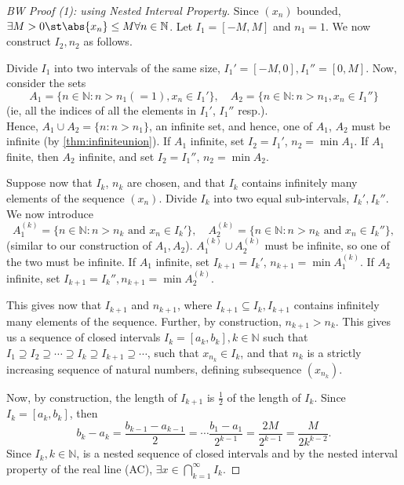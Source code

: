 \documentclass[12pt]{article}
\begin{document}
\begin{proof}[BW Proof (1): using Nested Interval Property]
  \footnotemark Since $(x_n)$ bounded, $\exists M > 0 \st \abs{x_n} \leq M \forall n \in \mathbb{N}$. Let $I_1 = [-M, M]$ and $n_1 = 1$. We now construct $I_2, n_2$ as follows.

  Divide $I_1$ into two intervals of the same size, $I_1' = [-M, 0], I_1'' = [0, M]$. Now, consider the sets $$A_1 = \{n \in \mathbb{N} : n > n_1 (= 1), x_n \in I_1'\},\quad A_2 = \{n \in \mathbb{N} : n > n_1, x_{n} \in I_1''\}$$ (ie, all the indices of all the elements in $I_1'$, $I_1''$ resp.). \\Hence, $A_1 \cup A_2 = \{n : n > n_1\}$, an infinite set, and hence, one of $A_1$, $A_2$ must be infinite (by \cref{thm:infiniteunion}).
  If $A_1$ infinite, set $I_2 = I_1'$, $n_2 = \min A_1$. If $A_1$ finite, then $A_2$ infinite, and set $I_2 = I_1''$, $n_2 = \min A_2$.

  Suppose now that $I_k$, $n_k$ are chosen, and that $I_k$ contains infinitely many elements of the sequence $(x_n)$. Divide $I_k$ into two equal sub-intervals, $I_k', I_k''$. We now introduce $$A_1^{(k)} = \{n \in \mathbb{N} : n > n_k\text{ and } x_{n}\in I_k'\}, \quad A_2^{(k)} = \{n \in \mathbb{N} : n > n_k \text{ and } x_{n} \in I_k'' \},$$  (similar to our construction of $A_1, A_2$). $A_1^{(k)} \cup A_2^{(k)}$ must be infinite, so one of the two must be infinite. If $A_1$ infinite, set $I_{k+1} = I_k'$, $n_{k+1} = \min A_{1}^{(k)}$. If $A_2$ infinite, set $I_{k+1} = I_{k}'', n_{k+1} = \min A_{2}^{(k)}$.

  This gives now that $I_{k+1}$ and $n_{k+1}$, where $I_{k+1} \subseteq I_k, I_{k+1}$ contains infinitely many elements of the sequence. Further, by construction, $n_{k+1} > n_k$. This gives us a sequence of closed intervals $I_k = [a_k, b_k], k \in \mathbb{N}$ such that $I_1 \supseteq I_2 \supseteq \cdots \supseteq I_k \supseteq I_{k+1} \supseteq \cdots$, such that $x_{n_k} \in I_k$, and that $n_k$ is a strictly increasing sequence of natural numbers, defining subsequence $(x_{n_k})$.

  Now, by construction, the length of $I_{k+1}$ is $\frac{1}{2}$ of the length of $I_k$. Since $I_k = [a_k, b_k]$, then \[
  b_k - a_k = \frac{b_{k-1} - a_{k-1}}{2} = \cdots \frac{b_1 - a_1}{2^{k-1}} = \frac{2M}{2^{k-1}} = \frac{M}{2k^{k-2}}.
  \]
  Since $I_k, k \in \mathbb{N}$, is a nested sequence of closed intervals and by the nested interval property of the real line (AC), $\exists x \in \bigcap_{k=1}^{\infty} I_k$.
  

\end{proof}
\end{document}
